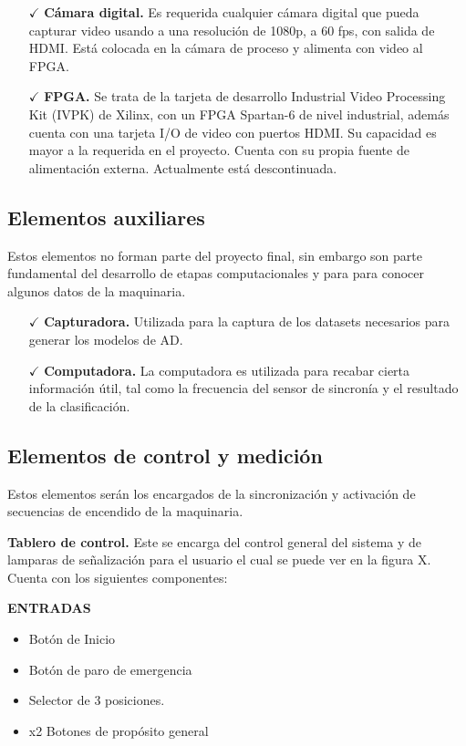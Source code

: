 \documentclass[twoside,spanish,ESP,MSc]{plantillaLabUPV}
\theoremstyle{definition}
\begin{document}
\begin{itemize}
	\item[$\checkmark$] \textbf{Cámara digital.} Es requerida cualquier cámara digital que pueda capturar video usando a una resolución de 1080p, a 60 fps, con salida de HDMI. Está colocada en la cámara de proceso y alimenta con video al FPGA.
	\item[$\checkmark$] \textbf{FPGA.} Se trata de la tarjeta de desarrollo Industrial Video Processing Kit (IVPK) de Xilinx, con un FPGA Spartan-6 de nivel industrial, además cuenta con una tarjeta I/O de video con puertos HDMI. Su capacidad es mayor a la requerida en el proyecto. Cuenta con su propia fuente de alimentación externa. Actualmente está descontinuada.

\end{itemize}




\subsection{Elementos auxiliares}
Estos elementos no forman parte del proyecto final, sin embargo son parte fundamental del desarrollo de etapas computacionales y para para conocer algunos datos de la maquinaria.

\begin{itemize}
	\item[$\checkmark$] \textbf{Capturadora.} Utilizada para la captura de los datasets necesarios para generar los modelos de AD.
	
	\item[$\checkmark$] \textbf{Computadora.} La computadora es utilizada para recabar cierta información útil, tal como la frecuencia del sensor de sincronía y el resultado de la clasificación.
\end{itemize}



\subsection{Elementos de control y medición}
Estos elementos serán los encargados de la sincronización y activación de secuencias de encendido de la maquinaria.


\checkmark\textbf{Tablero de control.} Este se encarga del control general del sistema y de lamparas de señalización para el usuario el cual se puede ver en la figura X. Cuenta con los siguientes componentes:

\textbf{ENTRADAS}
\begin{multicols}{2}
\begin{itemize}	
	\item Botón de Inicio
	\item Botón de paro de emergencia
	\item Selector de 3 posiciones.
	\item x2 Botones de propósito general
\end{itemize}
\end{multicols}
\end{document}
